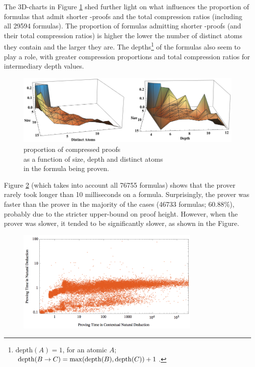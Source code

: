 \documentclass{llncs}
\begin{document}
\noindent
The 3D-charts in Figure \ref{fig:3D} shed further light on what influences the proportion of formulas that admit shorter {\NDd}-proofs and the total compression ratios (including all 29594 formulas). The proportion of formulas admitting shorter {\NDd}-proofs (and their total compression ratios) is higher the lower the number of distinct atoms they contain and the larger they are. The depths\footnote{$\mathrm{depth}(A) = 1$, for an atomic $A$; $\mathrm{depth}(B \rightarrow C) = \mathrm{max}(\mathrm{depth}(B), \mathrm{depth}(C)) + 1$.} of the formulas also seem to play a role, with greater compression proportions and total compression ratios for intermediary depth values.

\begin{figure}[!ht]
  \centering
  \includegraphics[width=\textwidth]{Charts/3DProportion.png}
  \caption{proportion of compressed proofs\\
           as a function of size, depth and distinct atoms\\
           in the formula being proven.} \label{fig:3D}
\end{figure}

\noindent
Figure \ref{fig:Time} (which takes into account all 76755 formulas) shows that the {\ND} prover rarely took longer than 10 milliseconds on a formula. Surprisingly, the {\NDd} prover was faster than the {\ND} prover in the majority of the cases (46733 formulas; 60.88\%), probably due to the stricter upper-bound on proof height. However, when the {\NDd} prover was slower, it tended to be significantly slower, as shown in the Figure. 

\begin{figure}[!ht]
        \centering
        \includegraphics[width=0.8\textwidth]{Charts/Time.png}
        \caption{} \label{fig:Time}
\end{figure}
\end{document}
